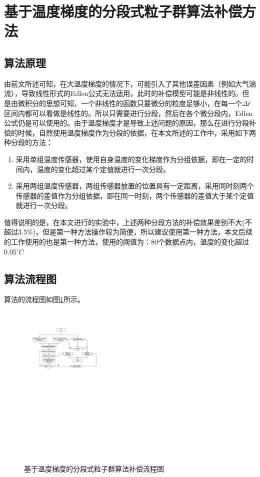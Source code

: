 \section{基于温度梯度的分段式粒子群算法补偿方法}
\label{温度梯度的分段式粒子群算法补偿方法}
\subsection{算法原理}
由前文所述可知，在大温度梯度的情况下，可能引入了其他误差因素（例如大气湍流），导致线性形式的Edlen公式无法适用，此时的补偿模型可能是非线性的。但是由微积分的思想可知，一个非线性的函数只要微分的粒度足够小，在每一个$\Delta t$区间内都可以看做是线性的。所以只需要进行分段，然后在各个微分段内，Edlen公式仍是可以使用的。由于温度梯度才是导致上述问题的原因，那么在进行分段补偿的时候，自然使用温度梯度作为分段的依据，在本文所述的工作中，采用如下两种分段的方法：
\begin{enumerate}
  \item 采用单组温度传感器，使用自身温度的变化梯度作为分组依据，即在一定的时间内，温度的变化超过某个定值就进行一次分段。
  \item 采用两组温度传感器，两组传感器放置的位置具有一定距离，采用同时刻两个传感器的差值作为分组依据，即在同一时刻，两个传感器的差值大于某个定值就进行一次分段。
\end{enumerate}

值得说明的是，在本文进行的实验中，上述两种分段方法的补偿效果差别不大(不超过$3.5\%$)，但是第一种方法操作较为简便，所以建议使用第一种方法，本文后续的工作使用的也是第一种方法，使用的阈值为：80个数据点内，温度的变化超过$0.05^{\circ}C$

\subsection{算法流程图}
\label{基于温度梯度的分段式粒子群算法补偿流程图}
算法的流程图如图\ref{fig:基于温度梯度的分段式粒子群算法补偿流程图}所示。
\begin{figure}[htb]
  \centering
  \includegraphics[width=12cm]{fig/4-fig/基于温度梯度的分段式粒子群算法流程图.drawio.pdf}
  \caption{基于温度梯度的分段式粒子群算法补偿流程图}
  \label{fig:基于温度梯度的分段式粒子群算法补偿流程图}
\end{figure}

